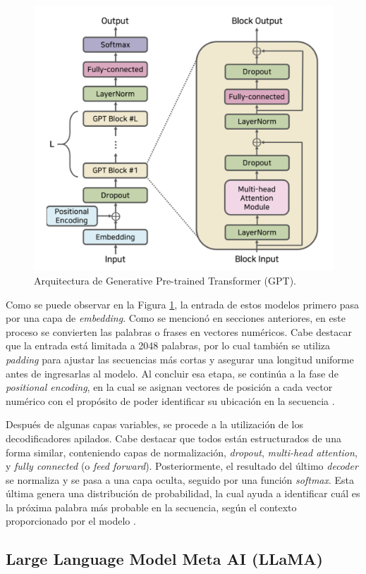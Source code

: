 \begin{figure}[H]
  \centering
  \includegraphics[width=0.5\linewidth]{figuras/GPT.png}
  \caption{Arquitectura de Generative Pre-trained Transformer (GPT).}
  \label{fig:GPT}
\end{figure}

Como se puede observar en la Figura \ref{fig:GPT}, la entrada de estos modelos primero pasa por una capa de \textit{embedding}. Como se mencionó en secciones anteriores, en este proceso se convierten las palabras o frases en vectores numéricos. Cabe destacar que la entrada está limitada a 2048 palabras, por lo cual también se utiliza \textit{padding} para ajustar las secuencias más cortas y asegurar una longitud uniforme antes de ingresarlas al modelo. Al concluir esa etapa, se continúa a la fase de \textit{positional encoding}, en la cual se asignan vectores de posición a cada vector numérico con el propósito de poder identificar su ubicación en la secuencia \cite{thirtytwo}.

Después de algunas capas variables, se procede a la utilización de los decodificadores apilados. Cabe destacar que todos están estructurados de una forma similar, conteniendo capas de normalización, \textit{dropout}, \textit{multi-head attention}, y \textit{fully connected} (o \textit{feed forward}). Posteriormente, el resultado del último \textit{decoder} se normaliza y se pasa a una capa oculta, seguido por una función \textit{softmax}. Esta última genera una distribución de probabilidad, la cual ayuda a identificar cuál es la próxima palabra más probable en la secuencia, según el contexto proporcionado por el modelo \cite{thirtytwo}.



\subsection{Large Language Model Meta AI (LLaMA)}

